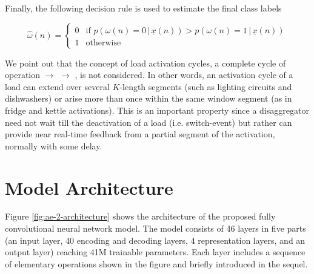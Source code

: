 \documentclass[twocolumn,letter,10pt]{IEEEtran} %
\begin{document}
Finally, the following decision rule is used to estimate the final class labels

{\small\begin{equation*}
	\hat{\omega}(n)=
	\begin{cases}
	0 & \text{if } p(\omega(n) = 0\,|\,\underline{x}(n)) > p(\omega(n) = 1\,|\,\underline{x}(n)) \\[1mm]
	1 & \text{otherwise}
	\end{cases}
	\end{equation*}}%

We point out that the concept of load activation cycles, a complete cycle of operation \off $\rightarrow$ \on $\rightarrow$ \off, is not considered. In other words, an activation cycle of a load can extend over several $K$-length segments (such as lighting circuits and dishwashers) or arise more than once within the same window segment (as in fridge and kettle activations). This is an important property since a disaggregator need not wait till the deactivation of a load (i.e. switch-\off event) but rather can provide {near} real-time feedback from a partial segment of the activation, normally with some delay.

\section{Model Architecture}
\label{sec:model-selection}

Figure \ref{fig:ae-2-architecture} shows the architecture of the proposed fully convolutional neural network model. The model consists of 46 layers in five parts (an input layer, 40 encoding and decoding layers, 4 representation layers, and an output layer) reaching 41M trainable parameters. Each layer includes a sequence of elementary operations shown in the figure and briefly introduced in the sequel.
\end{document}
